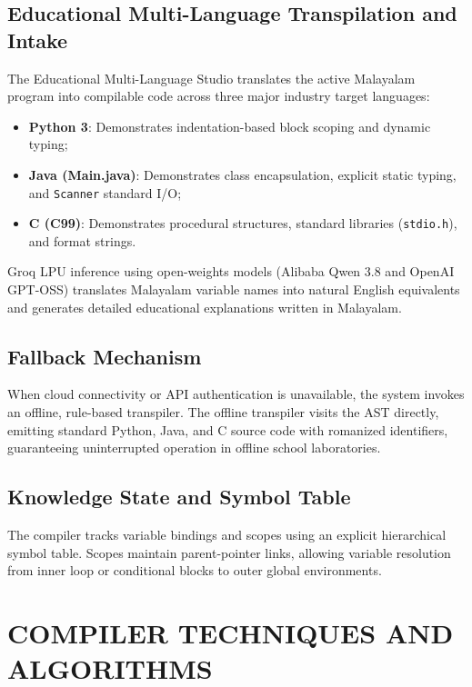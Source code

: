 \documentclass[12pt,a4paper]{report}
\begin{document}
\section{Educational Multi-Language Transpilation and Intake}
The Educational Multi-Language Studio translates the active Malayalam program into compilable code across three major industry target languages:
\begin{itemize}
    \item \textbf{Python 3}: Demonstrates indentation-based block scoping and dynamic typing;
    \item \textbf{Java (Main.java)}: Demonstrates class encapsulation, explicit static typing, and \texttt{Scanner} standard I/O;
    \item \textbf{C (C99)}: Demonstrates procedural structures, standard libraries (\texttt{stdio.h}), and format strings.
\end{itemize}
Groq LPU inference using open-weights models (Alibaba Qwen 3.8 and OpenAI GPT-OSS) translates Malayalam variable names into natural English equivalents and generates detailed educational explanations written in Malayalam.

\section{Fallback Mechanism}
When cloud connectivity or API authentication is unavailable, the system invokes an offline, rule-based transpiler. The offline transpiler visits the AST directly, emitting standard Python, Java, and C source code with romanized identifiers, guaranteeing uninterrupted operation in offline school laboratories.

\section{Knowledge State and Symbol Table}
The compiler tracks variable bindings and scopes using an explicit hierarchical symbol table. Scopes maintain parent-pointer links, allowing variable resolution from inner loop or conditional blocks to outer global environments.

\newpage
\chapter{COMPILER TECHNIQUES AND ALGORITHMS}
\end{document}
